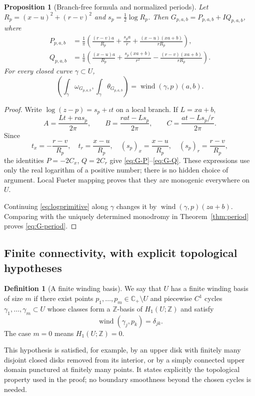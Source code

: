 \documentclass[11pt,a4paper]{article}
\numberwithin{equation}{section}
\newtheorem{proposition}[theorem]{Proposition}
\theoremstyle{definition}
\newtheorem{definition}[theorem]{Definition}
\theoremstyle{remark}
\newcommand{\C}{\mathbb C}
\newcommand{\Cp}{\C_+}
\newcommand{\wind}{\operatorname{wind}}
\begin{document}
\begin{proposition}[Branch-free formula and normalized periods]
\label{prop:generators}
Let $R_p=(x-u)^2+(r-v)^2$ and $s_p=\tfrac12\log R_p$.
Then $G_{p,a,b}=P_{p,a,b}+IQ_{p,a,b}$, where
\begin{align}
 P_{p,a,b}&=\frac1\pi\left(
 \frac{(r-v)a}{R_p}+\frac{s_p a}{r}
 +\frac{(x-u)(xa+b)}{rR_p}\right),
 \label{eq:G-P}\\
 Q_{p,a,b}&=\frac1\pi\left(
 \frac{(x-u)a}{R_p}+\frac{s_p(xa+b)}{r^2}
 -\frac{(r-v)(xa+b)}{rR_p}\right).
 \label{eq:G-Q}
\end{align}
For every closed curve $\gamma\subset U$,
\begin{equation}
 \left(\int_\gamma\omega_{G_{p,a,b}},
       \int_\gamma\theta_{G_{p,a,b}}\right)
 =\wind(\gamma,p)(a,b).
 \label{eq:G-period}
\end{equation}
\end{proposition}
\begin{proof}
Write $\log(z-p)=s_p+\iota t$ on a local branch. If $L=xa+b$,
\[
 A=\frac{Lt+ra s_p}{2\pi},\qquad
 B=\frac{ra t-Ls_p}{2\pi},\qquad
 C=\frac{a t-Ls_p/r}{2\pi}.
\]
Since
\[
 t_x=-\frac{r-v}{R_p},\quad t_r=\frac{x-u}{R_p},\quad
 (s_p)_x=\frac{x-u}{R_p},\quad (s_p)_r=\frac{r-v}{R_p},
\]
the identities $P=-2C_x$, $Q=2C_r$ give
\eqref{eq:G-P}--\eqref{eq:G-Q}. These expressions use only the real logarithm
of a positive number; there is no hidden choice of argument. Local Fueter
mapping proves that they are monogenic everywhere on $U$.

Continuing \eqref{eq:logprimitive} along $\gamma$ changes it by
$\wind(\gamma,p)(za+b)$. Comparing with the uniquely determined monodromy
in Theorem~\ref{thm:period} proves \eqref{eq:G-period}.
\end{proof}

\subsection{Finite connectivity, with explicit topological hypotheses}
\begin{definition}[A finite winding basis]
\label{def:finitebasis}
We say that $U$ has a finite winding basis of size $m$ if there exist points
$p_1,\ldots,p_m\in\Cp\setminus U$ and piecewise $C^1$ cycles
$\gamma_1,\ldots,\gamma_m\subset U$ whose classes form a $\mathbb Z$-basis
of $H_1(U;\mathbb Z)$ and satisfy
\[
 \wind(\gamma_j,p_k)=\delta_{jk}.
\]
The case $m=0$ means $H_1(U;\mathbb Z)=0$.
\end{definition}
This hypothesis is satisfied, for example, by an upper disk with finitely many
disjoint closed disks removed from its interior, or by a simply connected
upper domain punctured at finitely many points. It states explicitly the
topological property used in the proof; no boundary smoothness beyond the
chosen cycles is needed.
\end{document}
